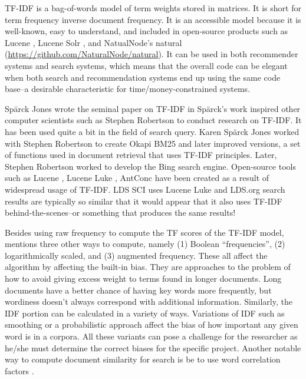 TF-IDF is a bag-of-words model of term weights stored in matrices. It is short for term frequency inverse document frequency.  It is an accessible model because it is well-known, easy to understand, and included in open-source products such as Lucene \citep{McCandless:2010:LAS:1893016}, Lucene Solr \citep{apache_solr_beginners_guide_2013,apache_solr_enterprise_search_server_2015}, and NatualNode’s natural (\url{https://github.com/NaturalNode/natural}).  It can be used in both recommender systems and search systems, which means that the overall code can be elegant when both search and recommendation systems end up using the same code base--a desirable characteristic for time/money-constrained systems.

Sp\"{a}rck Jones wrote the seminal paper on TF-IDF in \citeyear{sparck1972statistical} \citep{sparck1972statistical}
Sp\"{a}rck’s work inspired other computer scientists such as Stephen Robertson to conduct research on TF-IDF. It has been used quite a bit in the field of search query. Karen Sp\"{a}rck Jones worked with Stephen Robertson to create Okapi BM25 and later improved versions, a set of functions used in document retrieval that uses TF-IDF principles. Later, Stephen Robertson worked to develop the Bing search engine. Open-source tools such as Lucene \citep{McCandless:2010:LAS:1893016}, Lucene Luke \citep{lucene:luke}, AntConc \citep{anthony_2013} have been created as a result of widespread usage of TF-IDF. LDS SCI uses Lucene Luke and LDS.org search results are typically so similar that it would appear that it also uses TF-IDF behind-the-scenes--or something that produces the same results!

Besides using raw frequency to compute the TF scores of the TF-IDF model, \citet{manning_raghavan_2008_scoring} mentions three other ways to compute, namely (1) Boolean ``frequencies'', (2) logarithmically scaled, and (3) augmented frequency. These all affect the algorithm by affecting the built-in bias. They are approaches to the problem of how to avoid giving excess weight to terms found in longer documents. Long documents have a better chance of having key words more frequently, but wordiness doesn’t always correspond with additional information.  Similarly, the IDF portion can be calculated in a variety of ways. Variations of IDF such as smoothing or a probabilistic approach affect the bias of how important any given word is in a corpora. All these variants can pose a challenge for the researcher as he/she must determine the correct biases for the specific project. Another notable way to compute document similarity for search is be to use word correlation factors \citep{won2007using}.

